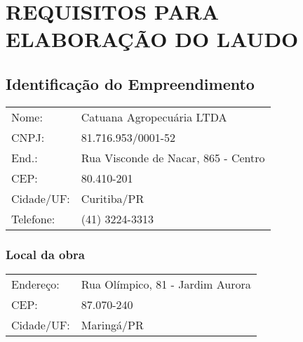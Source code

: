 \chapter{REQUISITOS PARA ELABORAÇÃO DO LAUDO}

\section{Identificação do Empreendimento}

\begin{tabular}{ll}
Nome: & Catuana Agropecuária LTDA\\
CNPJ: & 81.716.953/0001-52\\
End.: & Rua Visconde de Nacar, 865 - Centro\\
CEP:  & 80.410-201\\
Cidade/UF:  & Curitiba/PR\\
Telefone: & (41) 3224-3313\\
\end{tabular}


\subsection*{Local da obra}

\begin{tabularx}{\textwidth}{lX}
Endereço:  & Rua Olímpico, 81 - Jardim Aurora\\
CEP:  & 87.070-240\\
Cidade/UF:  & Maringá/PR \\
\end{tabularx}
